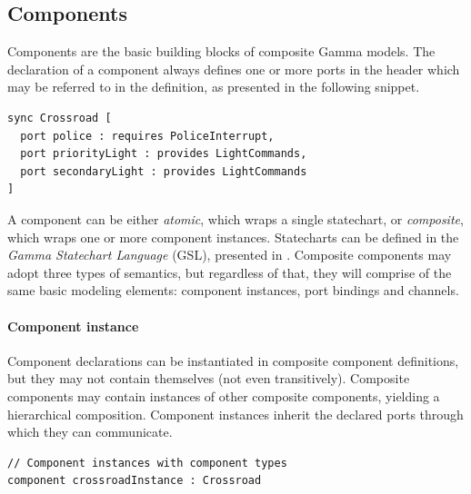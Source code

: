 \subsection{Components}
Components are the basic building blocks of composite Gamma models. The declaration of a component always defines one or more ports in the header which may be referred to in the definition, as presented in the following snippet.
\begin{lstlisting}
sync Crossroad [
  port police : requires PoliceInterrupt,
  port priorityLight : provides LightCommands,
  port secondaryLight : provides LightCommands
]
\end{lstlisting}

A component can be either \emph{atomic}, which wraps a single statechart, or \emph{composite}, which wraps one or more component instances. Statecharts can be defined in the \emph{Gamma Statechart Language} (GSL), presented in \cite{graics-bence-bsc}. Composite components may adopt three types of semantics, but regardless of that, they will comprise of the same basic modeling elements: component instances, port bindings and channels.

\paragraph{Component instance} Component declarations can be instantiated in composite component definitions, but they may not contain themselves (not even transitively). Composite components may contain instances of other composite components, yielding a hierarchical composition.
Component instances inherit the declared ports through which they can communicate.

\begin{lstlisting}
// Component instances with component types
component crossroadInstance : Crossroad
\end{lstlisting}

